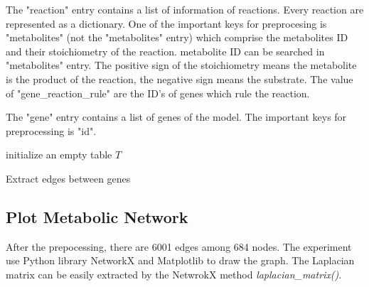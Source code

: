 \documentclass{article} %
\begin{document}
The "reaction" entry contains a list of information of reactions. Every reaction are represented as a dictionary. One of the important keys for preprocesing is "metabolites" (not the "metabolites" entry) which comprise the metabolites ID and their stoichiometry of the reaction. metabolite ID can be searched in "metabolites" entry. The positive sign of the stoichiometry means the metabolite is the product of the reaction, the negative sign means the substrate. The value of "gene\_reaction\_rule" are the ID's of genes which rule the reaction.

The "gene" entry contains a list of genes of the model. The important keys for preprocessing is "id".

\begin{algorithm}[H]
\SetAlgoLined
{}
 initialize an empty table $T$\;
 
 
 \caption{Extract edges between genes}
\end{algorithm}

\subsection{Plot Metabolic Network}
After the prepocessing, there are 6001 edges among 684 nodes. The experiment use Python library NetworkX and Matplotlib to draw the graph. The Laplacian matrix can be easily extracted by the NetwrokX method \textit{laplacian\_matrix()}.
\end{document}
